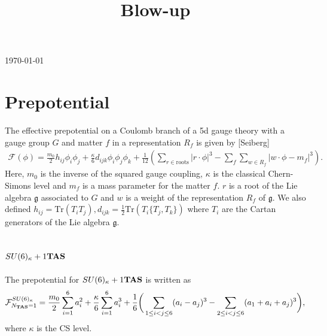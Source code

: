 \documentclass[11pt,a4paper]{article}
\title{Blow-up}
\begin{document}
\preprint{
\begin{flushright}
\tt 
\end{flushright}
}
\today 
\section{Prepotential}
The effective prepotential on a Coulomb branch of a 5d gauge theory with a gauge group $G$ and matter $f$ in a representation $R_f$ is given by [Seiberg] %
\begin{align}
\mathcal{F}(\phi) = \frac{m_0}{2}h_{ij}\phi_i\phi_j + \frac{\kappa}{6}d_{ijk}\phi_i\phi_j\phi_k + \frac{1}{12}\left(\sum_{r\in\text{roots}}\left|r\cdot \phi\right|^3 - \sum_f\sum_{w \in R_f}\left|w\cdot \phi - m_f\right|^3\right). \label{prepotential}
\end{align}
Here, $m_0$ is the inverse of the squared gauge coupling, $\kappa$ is the classical Chern-Simons level and $m_f$ is a mass parameter for the matter $f$. $r$ is a root of the Lie algebra $\mathfrak{g}$ associated to $G$ and $w$ is a weight of the representation $R_f$ of $\mathfrak{g}$. We also defined $h_{ij} = \text{Tr}(T_iT_j), d_{ijk} = \frac{1}{2}\text{Tr}\left(T_i\{T_j, T_k\}\right)$ where $T_i$ are the Cartan generators of the Lie algebra $\mathfrak{g}$.
\subsection{$SU(6)_\kappa+1{\bf TAS}$}
The prepotential for $SU(6)_\kappa+1{\bf TAS}$ is written as 
\begin{align}
\mathcal{F}^{SU(6)_{\kappa}}_{N_{{\bf TAS}}=1} = \frac{m_0}{2}\sum_{i=1}^6a_i^2 + \frac{\kappa}{6}\sum_{i=1}^6a_i^3 +\frac{1}{6}\bigg(\sum_{1 \leq i < j \leq 6}(a_i - a_j)^3 - \sum_{2 \leq i < j \leq 6}(a_1 + a_i + a_j)^3\bigg), \label{eq:preSU6TSA}
\end{align}
where $\kappa$ is the CS level. 
\end{document}
